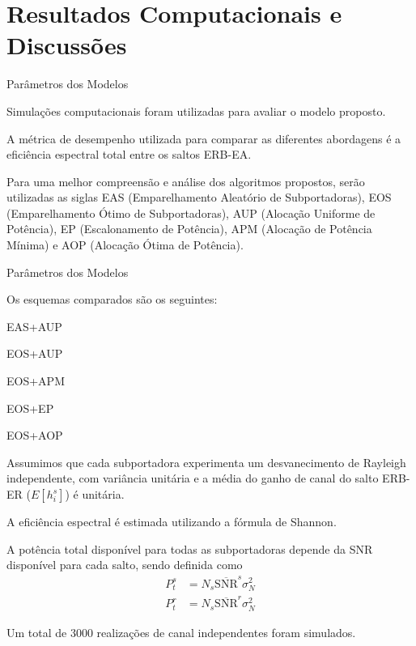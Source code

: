 \section{Resultados Computacionais e Discussões}\label{sec:res_comp_disc}
\AtBeginSec

\begin{frame}{Parâmetros dos Modelos}
  \begin{bigitem}
     \item Simulações computacionais foram utilizadas para avaliar o modelo proposto.
     \item A métrica de desempenho utilizada para comparar as diferentes abordagens é a eficiência espectral total entre os saltos ERB-EA.
     \item Para uma melhor compreensão e análise dos algoritmos propostos, serão utilizadas as siglas EAS (Emparelhamento Aleatório de Subportadoras), EOS (Emparelhamento Ótimo de Subportadoras), AUP (Alocação Uniforme de Potência), EP (Escalonamento de Potência), APM (Alocação de Potência Mínima) e AOP (Alocação Ótima de Potência).
  \end{bigitem}
\end{frame}

\begin{frame}{Parâmetros dos Modelos}
  \begin{bigitem}
     \item Os esquemas comparados são os seguintes:
     \begin{bigitem}
        \item EAS+AUP
        \item EOS+AUP
        \item EOS+APM
        \item EOS+EP
        \item EOS+AOP
     \end{bigitem}
  \end{bigitem}
\end{frame}

\begin{frame}
   \begin{bigitem}
      \item Assumimos que cada subportadora experimenta um desvanecimento de Rayleigh independente, com variância unitária e a média do ganho de canal do salto ERB-ER ($E[h_i^s]$) é unitária.
      \item A eficiência espectral é estimada utilizando a fórmula de Shannon.
      \item A potência total disponível para todas as subportadoras depende da SNR disponível para cada salto, sendo definida como 
      \begin{align}
         P_t^s &= N_s\overline{\text{SNR}}^{s}\sigma^2_N\\
         P_t^r &= N_s\overline{\text{SNR}}^{r}\sigma^2_N
      \end{align}
      \item Um total de 3000 realizações de canal independentes foram simulados.
   \end{bigitem}
\end{frame}

